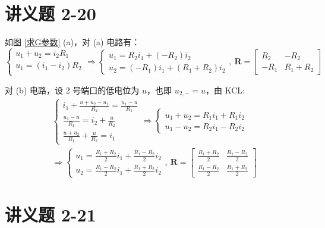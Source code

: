 \documentclass[UTF8]{report}
\theoremstyle{MyLineTheoremStyle} %
\theoremstyle{MyBlockTheoremStyle} %
\theoremstyle{MySubsubsectionStyle} %
\begin{document}
\section{讲义题 2-20}


如图 \ref{求G参数} (a)，对 (a) 电路有：
\begin{equation}
\begin{cases}
    u_1 + u_2 = i_2R_1 \\ 
    u_1 = (i_1 - i_2)R_2 \\ 
\end{cases}
\Longrightarrow 
\begin{cases}
    u_1 = R_2 i_1 + (-R_2)i_2 \\ 
    u_2 = (-R_1)i_1 + (R_1+R_2)i_2
\end{cases},\ 
\boldsymbol{R} = 
\begin{bmatrix}
    R_2 & -R_2 \\ 
    -R_1 & R_1+R_2
\end{bmatrix}
\end{equation}

对 (b) 电路，设 2 号端口的低电位为 $u$，也即 $u_{2,-} = u$，由 KCL: 
\begin{gather}
\begin{cases}
    i_1 + \frac{u+u_2 - u_1}{R_2} = \frac{u_1 - u}{R_1} \\ 
    \frac{u_1 - u}{R_1} = i_2 + \frac{u}{R_2} \\ 
    \frac{u+u_2}{R_1} + \frac{u}{R_2} = i_1
\end{cases}
\Longrightarrow
\begin{cases}
    u_1 + u_2 = R_1i_1 + R_1i_2 \\ 
    u_1 - u_2 = R_2i_1 - R_2i_2
\end{cases} 
\\
\Longrightarrow 
\begin{cases}
    u_1 = \frac{R_1+R_2}{2}i_1 + \frac{R_1-R_2}{2}i_2 \\
    u_2 = \frac{R_1-R_2}{2}i_1 + \frac{R_1+R_2}{2}i_2
\end{cases},\ 
\boldsymbol{R} = 
\begin{bmatrix}
    \frac{R_1+R_2}{2} & \frac{R_1-R_2}{2} \\ 
    \frac{R_1-R_2}{2} & \frac{R_1+R_2}{2}
\end{bmatrix}
\end{gather}



\section{讲义题 2-21}
\end{document}
